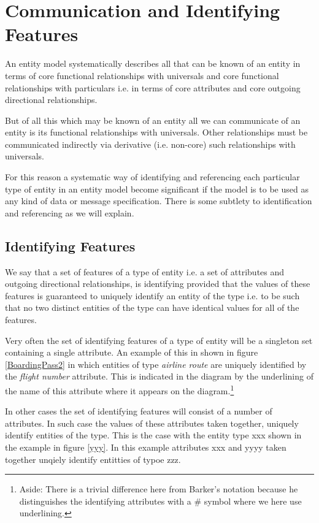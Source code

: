 \section{Communication and Identifying Features}

\mynote An entity model systematically describes all that can be known of an entity
in terms of core functional relationships with universals and core functional relationships with particulars i.e. in terms of core attributes and core outgoing directional relationships.

\mynote But of all this which  may be known of an entity all we can communicate of an entity is its functional relationships with universals. Other relationships must be communicated indirectly via derivative (i.e. non-core) such relationships with universals. 

\mynote For this reason a systematic way of identifying and referencing each particular type  of entity in an entity model become significant if the model is to be used as any kind of data or message specification. There is some subtlety to identification and referencing as we will explain.

\subsection*{Identifying Features}
\mynote We say that a set of features of a type of entity i.e. a set of attributes and outgoing directional relationships, is identifying provided that the values of these features is guaranteed to uniquely identify an entity of the type i.e. to be such that no two distinct entities of the type can have identical values for all of the features.

\mynote Very often the set of identifying features of a type of entity will be a singleton set containing a single attribute. An example of this 
in  shown in figure \ref{BoardingPass2} in which entities of type \textit{airline route} are uniquely identified by the \textit{flight number} attribute. This is
indicated in the diagram  by the underlining of the name of this attribute where it appears on the diagram.\footnote{Aside: There is a trivial difference here from Barker's notation because he distinguishes the identifying attributes with a \# symbol where we here use  underlining.} 

\mynote In other cases the set of identifying features will consist of a number of attributes. In such case  the values of these attributes taken together, uniquely identify entities of the type. This is the case with the entity type xxx shown in the example in figure \ref{yyy}. In this example attributes xxx and yyyy taken together unqiely identify entitties of typoe zzz. 

